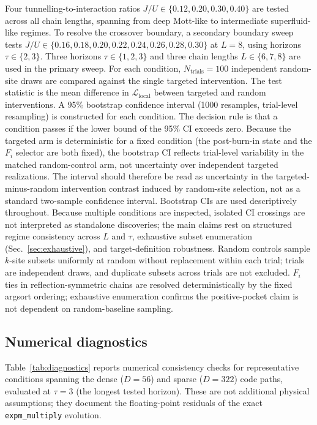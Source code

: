 \documentclass[aps,prresearch,reprint,amsmath,amssymb,longbibliography,floatfix]{revtex4-2}
\newcommand{\Fi}{F_i}
\begin{document}
Four tunnelling-to-interaction ratios $J/U\in\{0.12,0.20,0.30,0.40\}$ are
tested across all chain lengths, spanning from deep Mott-like to
intermediate superfluid-like regimes.
To resolve the crossover boundary, a secondary boundary sweep tests
$J/U\in\{0.16,0.18,0.20,0.22,0.24,0.26,0.28,0.30\}$ at $L=8$, using
horizons $\tau\in\{2,3\}$.
Three horizons $\tau\in\{1,2,3\}$ and three chain lengths $L\in\{6,7,8\}$
are used in the primary sweep.
For each condition, $N_{\mathrm{trials}}=100$ independent random-site draws
are compared against the single targeted intervention.
The test statistic is the mean difference in $\mathcal{L}_{\mathrm{local}}$
between targeted and random interventions.
A 95\% bootstrap confidence interval (1000 resamples, trial-level
resampling) is constructed for each condition.
The decision rule is that a condition passes if the lower bound of the
95\% CI exceeds zero.
Because the targeted arm is deterministic for a fixed condition (the
post-burn-in state and the $\Fi$ selector are both fixed), the bootstrap
CI reflects trial-level variability in the matched random-control arm,
not uncertainty over independent targeted realizations.
The interval should therefore be read as uncertainty in the
targeted-minus-random intervention contrast induced by random-site
selection, not as a standard two-sample confidence interval.
Bootstrap CIs are used descriptively throughout.
Because multiple conditions are inspected, isolated CI crossings are not
interpreted as standalone discoveries; the main claims rest on structured
regime consistency across $L$ and $\tau$, exhaustive subset enumeration
(Sec.~\ref{sec:exhaustive}), and target-definition robustness.
Random controls sample $k$-site subsets uniformly at random without
replacement within each trial; trials are independent draws, and duplicate
subsets across trials are not excluded.
$\Fi$ ties in reflection-symmetric chains are resolved deterministically
by the fixed argsort ordering; exhaustive enumeration confirms the
positive-pocket claim is not dependent on random-baseline sampling.

\subsection{Numerical diagnostics}
\label{sec:numerics}

Table~\ref{tab:diagnostics} reports numerical consistency checks for
representative conditions spanning the dense ($D=56$) and sparse ($D=322$)
code paths, evaluated at $\tau=3$ (the longest tested horizon).
These are not additional physical assumptions; they document the
floating-point residuals of the exact \texttt{expm\_multiply} evolution.
\end{document}
